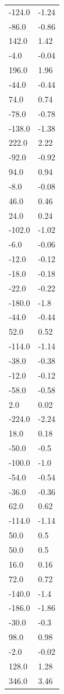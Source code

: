 \begin{longtable}{ll}
-124.0 & -1.24 \\
-86.0 & -0.86 \\
142.0 & 1.42 \\
-4.0 & -0.04 \\
196.0 & 1.96 \\
-44.0 & -0.44 \\
74.0 & 0.74 \\
-78.0 & -0.78 \\
-138.0 & -1.38 \\
222.0 & 2.22 \\
-92.0 & -0.92 \\
94.0 & 0.94 \\
-8.0 & -0.08 \\
46.0 & 0.46 \\
24.0 & 0.24 \\
-102.0 & -1.02 \\
-6.0 & -0.06 \\
-12.0 & -0.12 \\
-18.0 & -0.18 \\
-22.0 & -0.22 \\
-180.0 & -1.8 \\
-44.0 & -0.44 \\
52.0 & 0.52 \\
-114.0 & -1.14 \\
-38.0 & -0.38 \\
-12.0 & -0.12 \\
-58.0 & -0.58 \\
2.0 & 0.02 \\
-224.0 & -2.24 \\
18.0 & 0.18 \\
-50.0 & -0.5 \\
-100.0 & -1.0 \\
-54.0 & -0.54 \\
-36.0 & -0.36 \\
62.0 & 0.62 \\
-114.0 & -1.14 \\
50.0 & 0.5 \\
50.0 & 0.5 \\
16.0 & 0.16 \\
72.0 & 0.72 \\
-140.0 & -1.4 \\
-186.0 & -1.86 \\
-30.0 & -0.3 \\
98.0 & 0.98 \\
-2.0 & -0.02 \\
128.0 & 1.28 \\
346.0 & 3.46 \\

\end{longtable}
